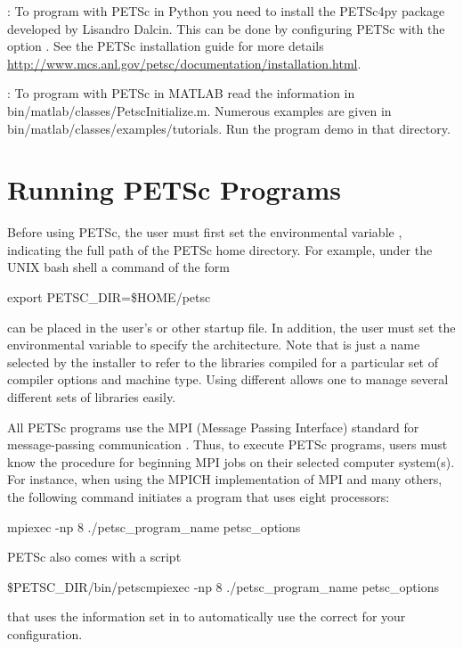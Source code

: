 : To program with PETSc in Python you need to install the PETSc4py package developed by
Lisandro Dalcin. This can be done by configuring PETSc with the option . See the PETSc installation guide
for more details \href{http://www.mcs.anl.gov/petsc/documentation/installation.html}{http://www.mcs.anl.gov/petsc/documentation/installation.html}.

: To program with PETSc in MATLAB read the information in bin/matlab/classes/PetscInitialize.m. Numerous examples
are given in bin/matlab/classes/examples/tutorials. Run the program demo in that directory.

\section{Running PETSc Programs}
\label{sec_running}

Before using PETSc, the user must first set the environmental variable
,  indicating the full path of the PETSc home
directory.  For example, under the UNIX bash shell a command of the form
\begin{tabbing}
   export PETSC\_DIR=\$HOME/petsc
\end{tabbing}
 can be placed in the user's  or other startup file.  In addition, the user must set the environmental
variable {} to specify the architecture. Note that
{} is just a name selected by the installer to refer to
the libraries compiled for a particular set of compiler options and
machine type. Using different {} allows one to manage
several different sets of libraries easily.

All PETSc programs use the MPI (Message Passing Interface) standard
for message-passing communication \cite{MPI-final}.  Thus, to execute
PETSc programs, users must know the procedure for beginning MPI jobs
on their selected computer system(s).  For instance, when using the
MPICH implementation of MPI \cite{mpich-web-page} and many others, the following
command initiates a program that uses eight processors:
 
\begin{tabbing}
   mpiexec -np 8 ./petsc\_program\_name petsc\_options
\end{tabbing}

PETSc also comes with a script
\begin{tabbing}
   \${PETSC\_DIR}/bin/petscmpiexec -np 8 ./petsc\_program\_name petsc\_options
\end{tabbing}
that uses the information set in  to
automatically use the correct  for your configuration.

